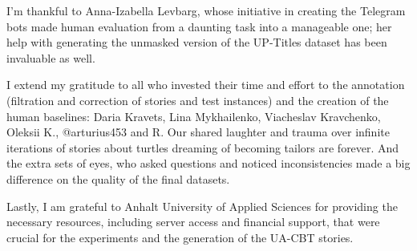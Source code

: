 \documentclass[
11pt, %
oneside, %
english, %
singlespacing, %
headsepline, %
chapterinoneline, %
]{MastersDoctoralThesis} %
\begin{document}
\begin{acknowledgements}
I'm thankful to Anna-Izabella Levbarg, whose initiative in creating the Telegram bots made human evaluation from a daunting task into a manageable one; her help with generating the unmasked version of the UP-Titles dataset has been invaluable as well.

I extend my gratitude to all who invested their time and effort to the annotation (filtration and correction of stories and test instances) and the creation of the human baselines:
Daria Kravets, Lina Mykhailenko,  Viacheslav Kravchenko, Oleksii K., @arturius453 and R. 
Our shared laughter and trauma over infinite iterations of stories about turtles dreaming of becoming tailors are forever.
And the extra sets of eyes, who asked questions and noticed inconsistencies made a big difference on the quality of the final datasets.

Lastly, I am grateful to Anhalt University of Applied Sciences for providing the necessary resources, including server access and financial support, that were crucial for the experiments and the generation of the UA-CBT stories.







\end{acknowledgements}
\end{document}
